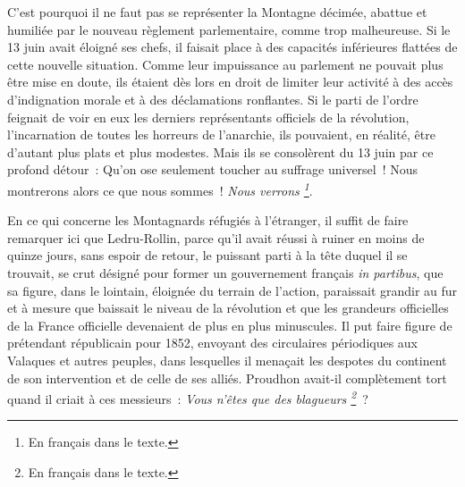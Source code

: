 \documentclass[french,twoside]{book} %
\begin{document}
C’est pourquoi il ne faut pas se représenter la Montagne décimée, abattue et humiliée par le nouveau règlement parlementaire, comme trop malheureuse. Si le 13 juin avait éloigné ses chefs, il faisait place à des capacités inférieures flattées de cette nouvelle situation. Comme leur impuissance au parlement ne pouvait plus être mise en doute, ils étaient dès lors en droit de limiter leur activité à des accès d’indignation morale et à des déclamations ronflantes. Si le parti de l’ordre feignait de voir en eux les derniers représentants officiels de la révolution, l’incarnation de toutes les horreurs de l’anarchie, ils pouvaient, en réalité, être d’autant plus plats et plus modestes. Mais ils se consolèrent du 13 juin par ce profond détour : Qu’on ose seulement toucher au suffrage universel ! Nous montrerons alors ce que nous sommes ! \emph{Nous verrons \footnote{En français dans le texte.}}.\par
En ce qui concerne les Montagnards réfugiés à l’étranger, il suffit de faire remarquer ici que Ledru-Rollin, parce qu’il avait réussi à ruiner en moins de quinze jours, sans espoir de retour, le puissant parti à la tête duquel il se trouvait, se crut désigné pour former un gouvernement français \emph{in partibus}, que sa figure, dans le lointain, éloignée du terrain de l’action, paraissait grandir au fur et à mesure que baissait le niveau de la révolution et que les grandeurs officielles de la France officielle devenaient de plus en plus minuscules. Il put faire figure de prétendant républicain pour 1852, envoyant des circulaires périodiques aux Valaques et autres peuples, dans lesquelles il menaçait les despotes du continent de son intervention et de celle de ses alliés. Proudhon avait-il complètement tort quand il criait à ces messieurs : \emph{Vous n’êtes que des blagueurs \footnote{En français dans le texte.}} ?\par
\end{document}
